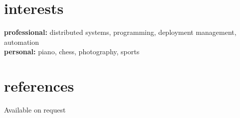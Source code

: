 \documentclass[]{friggeri-cv} %
\begin{document}

\section{interests}

\textbf{professional:} distributed systems, programming, deployment management, automation \\
\textbf{personal:} piano, chess, photography, sports


\section{references}

Available on request
\end{document}
